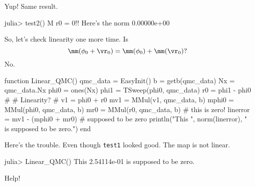 \documentclass[12pt]{siamltex}
\begin{document}
Yup! Same result.

\begin{code}
julia> test2()
M r0 = 0!! Here's the norm 0.00000e+00
\end{code}

\clearpage
So, let's check linearity one more time. Is
\[
\mm (\phi_0 + \vr_0) = \mm (\phi_0) + \mm(\vr_0) ?
\]
No.

\begin{code}
function Linear_QMC()
    qmc_data = EasyInit()
    b = getb(qmc_data)
    Nx = qmc_data.Nx
    phi0 = ones(Nx)
    phi1 = TSweep(phi0, qmc_data)
    r0 = phi1 - phi0
    #
    # Linearity?
    #
    v1 = phi0 + r0
    mv1 = MMul(v1, qmc_data, b)
    mphi0 = MMul(phi0, qmc_data, b)
    mr0 = MMul(r0, qmc_data, b) # this is zero!
    linerror = mv1 - (mphi0 + mr0) # supposed to be zero
    println("This ", norm(linerror), " is supposed to be zero.")
end
\end{code}

Here's the trouble. Even though {\tt test1} looked good. The map is
not linear.
\begin{code}

julia> Linear_QMC()
This 2.54114e-01 is supposed to be zero.
\end{code}

Help!
\end{document}
